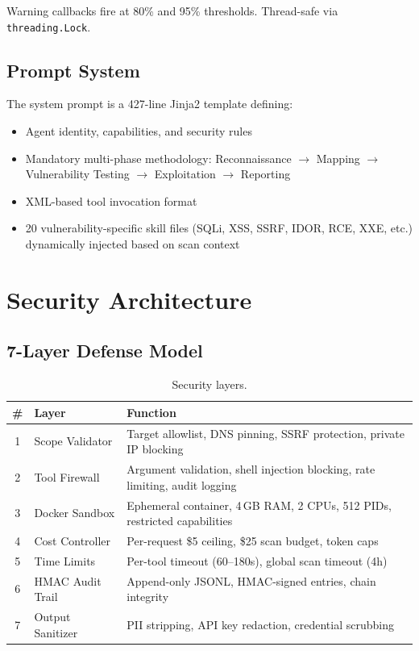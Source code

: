 \documentclass[12pt,a4paper]{report}
\begin{document}
Warning callbacks fire at 80\% and 95\% thresholds. Thread-safe via \texttt{threading.Lock}.

\section{Prompt System}

The system prompt is a 427-line Jinja2 template defining:
\begin{itemize}
    \item Agent identity, capabilities, and security rules
    \item Mandatory multi-phase methodology: Reconnaissance $\rightarrow$ Mapping $\rightarrow$ Vulnerability Testing $\rightarrow$ Exploitation $\rightarrow$ Reporting
    \item XML-based tool invocation format
    \item 20 vulnerability-specific skill files (SQLi, XSS, SSRF, IDOR, RCE, XXE, etc.) dynamically injected based on scan context
\end{itemize}


\chapter{Security Architecture}

\section{7-Layer Defense Model}

\begin{table}[H]
\centering
\caption{Security layers.}
\begin{tabularx}{\textwidth}{clX}
\toprule
\textbf{\#} & \textbf{Layer} & \textbf{Function} \\
\midrule
1 & Scope Validator     & Target allowlist, DNS pinning, SSRF protection, private IP blocking \\
2 & Tool Firewall       & Argument validation, shell injection blocking, rate limiting, audit logging \\
3 & Docker Sandbox      & Ephemeral container, 4\,GB RAM, 2 CPUs, 512 PIDs, restricted capabilities \\
4 & Cost Controller     & Per-request \$5 ceiling, \$25 scan budget, token caps \\
5 & Time Limits         & Per-tool timeout (60--180s), global scan timeout (4h) \\
6 & HMAC Audit Trail    & Append-only JSONL, HMAC-signed entries, chain integrity \\
7 & Output Sanitizer    & PII stripping, API key redaction, credential scrubbing \\
\bottomrule
\end{tabularx}
\end{table}
\end{document}
